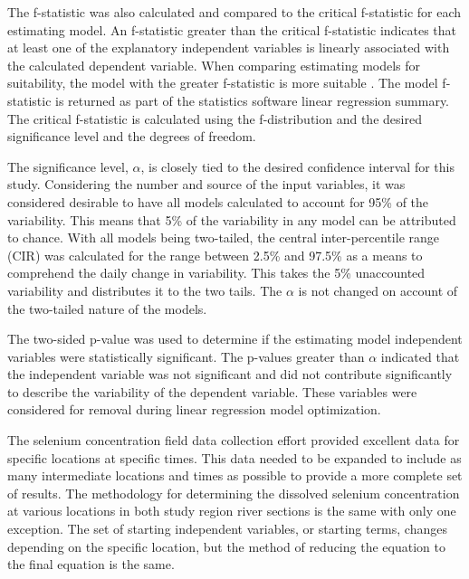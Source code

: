 The f-statistic was also calculated and compared to the critical f-statistic for each estimating model. An f-statistic greater than the critical f-statistic indicates that at least one of the explanatory independent variables is linearly associated with the calculated dependent variable.  When comparing estimating models for suitability, the model with the greater f-statistic is more suitable \parencite{Johnson2007}.  The model f-statistic is returned as part of the statistics software linear regression summary.  The critical f-statistic is calculated using the f-distribution and the desired significance level and the degrees of freedom.

The significance level, $\alpha$, is closely tied to the desired confidence interval for this study.  Considering the number and source of the input variables, it was considered desirable to have all models calculated to account for 95\% of the variability.  This means that 5\% of the variability in any model can be attributed to chance.  With all models being two-tailed, the central inter-percentile range (CIR) was calculated for the range between 2.5\% and 97.5\% as a means to comprehend the daily change in variability.  This takes the 5\% unaccounted variability and distributes it to the two tails.  The $\alpha$ is not changed on account of the two-tailed nature of the models.

The two-sided p-value was used to determine if the estimating model independent variables were statistically significant.  The p-values greater than $\alpha$ indicated that the independent variable was not significant and did not contribute significantly to describe the variability of the dependent variable.  These variables were considered for removal during linear regression model optimization.





The selenium concentration field data collection effort provided excellent data for specific locations at specific times.  This data needed to be expanded to include as many intermediate locations and times as possible to provide a more complete set of results.  The methodology for determining the dissolved selenium concentration at various locations in both study region river sections is the same with only one exception.  The set of starting independent variables, or starting terms, changes depending on the specific location, but the method of reducing the equation to the final equation is the same.

